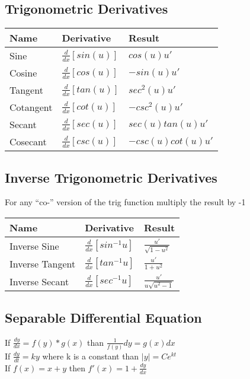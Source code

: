 \documentclass[17pt]{extarticle}
\begin{document}
\subsection{Trigonometric Derivatives}
\renewcommand{\arraystretch}{2}
\begin{table}[H]
\centering
\begin{tabular}{|l|l|l|}
\hline
\rowcolor{githublightgray}
Name & Derivative & Result\\
\hline
Sine&$\frac{d}{dx}[sin(u)]$&$cos(u)u\prime$\\
\hline
Cosine&$\frac{d}{dx}[cos(u)]$&$-sin(u)u\prime$\\
\hline
Tangent&$\frac{d}{dx}[tan(u)]$&$sec^2(u)u\prime$\\
\hline
Cotangent&$\frac{d}{dx}[cot(u)]$&$-csc^2(u)u\prime$\\
\hline
Secant&$\frac{d}{dx}[sec(u)]$&$sec(u)tan(u)u\prime$\\
\hline
Cosecant&$\frac{d}{dx}[csc(u)]$&$-csc(u)cot(u)u\prime$\\
\hline
\end{tabular}
\end{table}

\subsection{Inverse Trigonometric Derivatives}
For any ``co-'' version of the trig function multiply the result by -1
\renewcommand{\arraystretch}{2}
\begin{table}[H]
\centering
\begin{tabular}{|l|l|l|}
\hline
\rowcolor{githublightgray}
Name & Derivative & Result\\
\hline
Inverse Sine&$\frac{d}{dx}[sin^{-1}u]$&$\frac{u\prime}{\sqrt{1-u^2}}$\\
\hline
Inverse Tangent&$\frac{d}{dx}[tan^{-1}u]$&$\frac{u\prime}{1+u^2}$\\
\hline
Inverse Secant&$\frac{d}{dx}[sec^{-1}u]$&$\frac{u\prime}{u\sqrt{u^2-1}}$\\
\hline
\end{tabular}
\end{table}

\subsection{Separable Differential Equation}
If $\frac{dy}{dx}=f(y)*g(x)$ than $\frac{1}{f(y)}dy=g(x)dx$\\
If $\frac{dy}{dt} = ky$ where k is a constant than $\lvert y\rvert=Ce^{kt}$\\
If $f(x)=x+y$ then $f\prime(x)=1+\frac{dy}{dx}$\\
\clearpage
\end{document}
